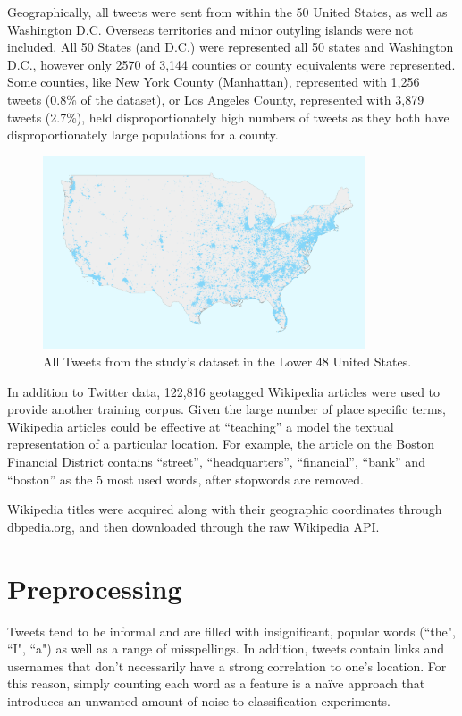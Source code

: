 \documentclass[midd]{thesis}
\begin{document}
Geographically, all tweets were sent from within the 50 United States, as well as Washington D.C. Overseas territories and minor outyling islands were not included. All 50 States (and D.C.) were represented all 50 states and Washington D.C., however only 2570 of 3,144 counties or county equivalents were represented. Some counties, like New York County (Manhattan), represented with 1,256 tweets (0.8\% of the dataset), or Los Angeles County, represented with 3,879 tweets (2.7\%), held disproportionately high numbers of tweets as they both have disproportionately large populations for a county.

\begin{figure}
\centering
\includegraphics[width=0.85\textwidth]{full_country_map.png}
\caption{All Tweets from the study's dataset in the Lower 48 United States.}
\label{fig:tweetmap}
\end{figure}

In addition to Twitter data, 122,816 geotagged Wikipedia articles were used to provide another training corpus. Given the large number of place specific terms, Wikipedia articles could be effective at ``teaching'' a model the textual representation of a particular location. For example, the article on the Boston Financial District contains ``street'', ``headquarters'', ``financial'', ``bank'' and ``boston'' as the 5 most used words, after stopwords are removed.

Wikipedia titles were acquired along with their geographic coordinates through dbpedia.org, and then downloaded through the raw Wikipedia API.


\section{Preprocessing}
Tweets tend to be informal and are filled with insignificant, popular words (``the", ``I", ``a") as well as a range of misspellings. In addition, tweets contain links and usernames that don't necessarily have a strong correlation to one's location. For this reason, simply counting each word as a feature is a naïve approach that introduces an unwanted amount of noise to classification experiments.
\end{document}
